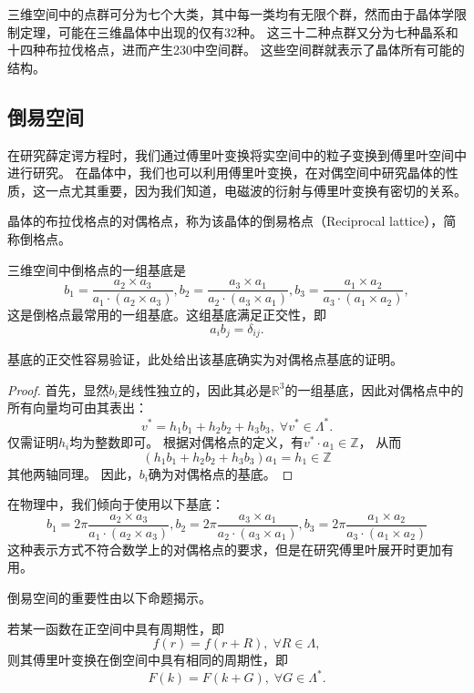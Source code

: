 三维空间中的点群可分为七个大类，其中每一类均有无限个群，然而由于晶体学限制定理，可能在三维晶体中出现的仅有32种。
这三十二种点群又分为七种晶系和十四种布拉伐格点，进而产生230中空间群。
这些空间群就表示了晶体所有可能的结构。

\subsection{倒易空间}

在研究薛定谔方程时，我们通过傅里叶变换将实空间中的粒子变换到傅里叶空间中进行研究。
在晶体中，我们也可以利用傅里叶变换，在对偶空间中研究晶体的性质，这一点尤其重要，因为我们知道，电磁波的衍射与傅里叶变换有密切的关系。

\begin{definition}
    晶体的布拉伐格点的对偶格点，称为该晶体的倒易格点（Reciprocal lattice），简称倒格点。
\end{definition}

\begin{proposition}
    三维空间中倒格点的一组基底是
    $$b_1 = \frac{a_2 \times a_3}{a_1 \cdot (a_2 \times a_3)}, b_2 = \frac{a_3 \times a_1}{a_2 \cdot (a_3 \times a_1)}, b_3 = \frac{a_1 \times a_2}{a_3 \cdot (a_1 \times a_2)},$$
    这是倒格点最常用的一组基底。这组基底满足正交性，即
    $$a_i b_j = \delta_{ij}.$$
\end{proposition}

基底的正交性容易验证，此处给出该基底确实为对偶格点基底的证明。

\begin{proof}
    首先，显然$b_i$是线性独立的，因此其必是$\mathbb R^3$的一组基底，因此对偶格点中的所有向量均可由其表出：
    $$v^* = h_1 b_1 + h_2 b_2 + h_3 b_3, \; \forall v^* \in \Lambda^*.$$
    仅需证明$h_i$均为整数即可。
    根据对偶格点的定义，有$v^* \cdot a_1\in \mathbb Z$，
    从而
    $$(h_1 b_1 + h_2 b_2 + h_3 b_3) a_1 = h_1 \in \mathbb Z$$
    其他两轴同理。
    因此，$b_i$确为对偶格点的基底。
\end{proof}

在物理中，我们倾向于使用以下基底：
$$
b_1 = 2\pi \frac{a_2 \times a_3}{a_1 \cdot (a_2 \times a_3)}, 
b_2 = 2\pi \frac{a_3 \times a_1}{a_2 \cdot (a_3 \times a_1)}, 
b_3 = 2\pi \frac{a_1 \times a_2}{a_3 \cdot (a_1 \times a_2)}
$$
这种表示方式不符合数学上的对偶格点的要求，但是在研究傅里叶展开时更加有用。

倒易空间的重要性由以下命题揭示。
\begin{proposition}
    若某一函数在正空间中具有周期性，即
    $$f(r) = f(r + R), \; \forall R \in \Lambda,$$
    则其傅里叶变换在倒空间中具有相同的周期性，即
    $$F(k) = F(k + G), \; \forall G \in \Lambda^*.$$
\end{proposition}

